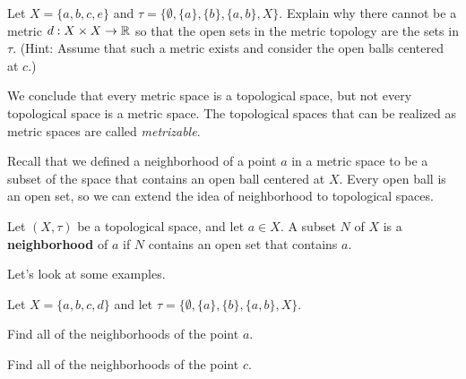 \begin{activity} Let $X = \{a,b,c,e\}$ and $\tau = \{\emptyset, \{a\}, \{b\}, \{a,b\}, X \}$. Explain why there cannot be a  metric $d : X \times X \to \mathbb{R}$ so that the open sets in the metric topology are the sets in $\tau$. (Hint: Assume that such a metric exists and consider the open balls centered at $c$.)  

\end{activity}

\begin{comment}

\ActivitySolution Assume such a metric $d$ exists. Let $r = d(a,c)$. Then $B(c,r)$ is an open set containing $c$. The only such open set is $X$, but $d(a,c) < r$ implies that $a \notin B(c,r)$. This contradiction shows that no such metric exists.  

\end{comment}

We conclude that every metric space is a topological space, but not every topological space is a metric space. The topological spaces that can be realized as metric spaces are called \emph{metrizable}. 

\label{sec_neighborhood_top_space}

Recall that we defined a neighborhood of a point $a$ in a metric space to be a subset of the space that contains an open ball centered at $X$. Every open ball is an open set, so we can extend the idea of neighborhood to topological spaces.

\begin{definition} Let $(X, \tau)$ be a topological space, and let $a \in X$. A subset $N$ of $X$ is a \textbf{neighborhood} of $a$ if $N$ contains an open set that contains $a$. 
\end{definition}

Let's look at some examples.

\begin{activity} Let $X = \{a,b,c,d\}$ and let $\tau = \{\emptyset, \{a\}, \{b\}, \{a,b\}, X \}$. 
\ba
\item Find all of the neighborhoods of the point $a$. 

\item Find all of the neighborhoods of the point $c$.

\ea

\end{activity}


